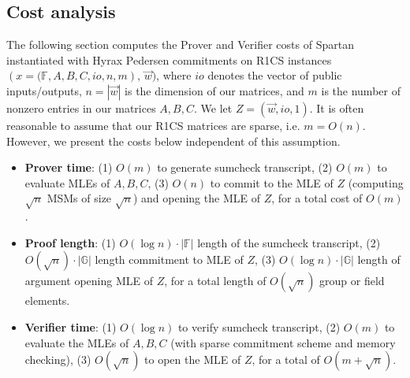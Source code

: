 


\subsection{Cost analysis}

The following section computes the Prover and Verifier costs of Spartan instantiated with Hyrax Pedersen commitments on R1CS instances $(x = \big(\mathbb{F}, A, B, C, io, n, m),\, \vec{w})$, 
where $io$ denotes the vector of public inputs/outputs, $n = |\vec{w}|$ is the dimension of our matrices, 
and $m$ is the number of nonzero entries in our matrices $A,B,C$. We let $Z = (\vec{w}, io, 1)$. 
It is often reasonable to assume that our R1CS matrices are sparse, i.e. $m = O(n)$. However, we present the costs below independent of this assumption.

\begin{itemize}
    \item \textbf{Prover time}: (1) $O(m)$ to generate sumcheck transcript, (2) $O(m)$ to evaluate MLEs of $A,B,C$, (3) $O(n)$ to commit to the MLE of $Z$ (computing $\sqrt{n}$ MSMs of size $\sqrt{n}$) and opening the MLE of $Z$, for a total cost of $O(m)$.
    \item \textbf{Proof length}: (1) $O(\log n) \cdot |\mathbb{F}|$ length of the sumcheck transcript, (2) $O(\sqrt{n}) \cdot |\mathbb{G}|$ length commitment to MLE of $Z$, (3) $O(\log n) \cdot |\mathbb{G}|$ length of argument opening MLE of $Z$, for a total length of $O(\sqrt{n})$ group or field elements.
    \item \textbf{Verifier time}: (1) $O(\log n)$ to verify sumcheck transcript, (2) $O(m)$ to evaluate the MLEs of $A,B,C$ (with sparse commitment scheme and memory checking), (3) $O(\sqrt{n})$ to open the MLE of $Z$, for a total of $O(m + \sqrt{n})$.
\end{itemize}

